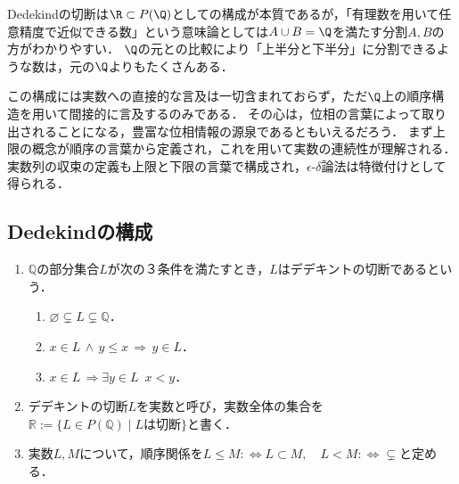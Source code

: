 \documentclass[uplatex,dvipdfmx]{jsreport}
\begin{document}
\begin{screen}
    Dedekindの切断は$\R\subset P(\Q)$としての構成が本質であるが，「有理数を用いて任意精度で近似できる数」という意味論としては$A\cup B=\Q$を満たす分割$A,B$の方がわかりやすい．
    $\Q$の元との比較により「上半分と下半分」に分割できるような数は，元の$\Q$よりもたくさんある．

    この構成には実数への直接的な言及は一切含まれておらず，ただ$\Q$上の順序構造を用いて間接的に言及するのみである．
    その心は，位相の言葉によって取り出されることになる，豊富な位相情報の源泉であるともいえるだろう．
    まず上限の概念が順序の言葉から定義され，これを用いて実数の連続性が理解される．
    実数列の収束の定義も上限と下限の言葉で構成され，$\epsilon$-$\delta$論法は特徴付けとして得られる．
\end{screen}

\subsection{Dedekindの構成}

\begin{definition}\mbox{}
    \begin{enumerate}
        \item $\mathbb{Q}$の部分集合$L$が次の３条件を満たすとき，$L$はデデキントの切断であるという．
        \begin{enumerate}[(1)]
            \item $\varnothing\subsetneq L\subsetneq\mathbb{Q}$．
            \item $x\in L \,\wedge\, y\le x \,\Rightarrow\, y\in L$．
            \item $x\in L \,\Rightarrow \exists y\in L \,\,\, x<y$．
        \end{enumerate}
        \item デデキントの切断$L$を実数と呼び，実数全体の集合を$\mathbb{R}:=\{ L\in P(\mathbb{Q})\mid Lは切断\}$と書く．
        \item 実数$L,M$について，順序関係を$L\le M :\Leftrightarrow L\subset M,\hspace{1em} L<M :\Leftrightarrow \subsetneq$と定める．
    \end{enumerate}
\end{definition}
\end{document}
